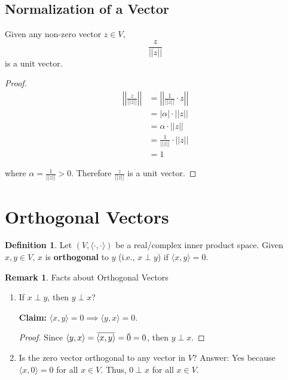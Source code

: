 \documentclass[12pt]{article}
\newcommand{\overbar}[1]{\mkern 1.5mu\overline{\mkern-1.5mu#1\mkern-1.5mu}\mkern 1.5mu}
\theoremstyle{definition}
\newtheorem*{definition}{Definition}
\newtheorem*{remark}{Remark}
\begin{document}
\subsection{Normalization of a Vector}

Given any non-zero vector $z \in V$,
\[ \frac{z}{||z||} \]
is a unit vector.

\begin{proof}
\begin{align*}
\left|\left| \frac{z}{||z||} \right|\right| &= \left|\left| \frac{1}{||z||} \cdot z \right|\right| \\
&= |\alpha| \cdot ||z|| \\
&= \alpha \cdot ||z|| \\
&= \frac{1}{||z||} \cdot ||z|| \\
&= 1
\end{align*}

where $\displaystyle \alpha = \frac{1}{||z||} > 0$. Therefore $\displaystyle \frac{z}{||z||}$ is a
unit vector.
\end{proof}

\section{Orthogonal Vectors}

\begin{definition}
Let $(V, \langle \cdot, \cdot \rangle )$ be a real/complex inner product space. Given $x, y \in V$,
$x$ is \textbf{orthogonal} to $y$ (i.e., $x \perp y$) if $\langle x, y \rangle = 0$.
\end{definition}

\begin{remark} Facts about Orthogonal Vectors

\begin{enumerate}[label = (\arabic*)]
\item If $x \perp y$, then $y \perp x$?

\textbf{Claim:} $\langle x, y \rangle = 0 \implies \langle y, x \rangle = 0$.
\begin{proof}
Since $\langle y, x \rangle = \overbar{\langle x, y \rangle} = \overbar{0} = 0$, then
$y \perp x$.
\end{proof}
\item Is the zero vector orthogonal to any vector in $V$?
Answer: Yes because $\langle x, 0 \rangle = 0$ for all $x \in V$. Thus, $0 \perp x$ for all
$x \in V$.
\end{enumerate}
\end{remark}
\end{document}
